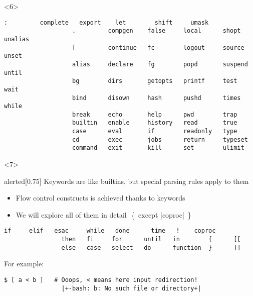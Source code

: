\begin{frame}
\begin{overlayarea}{\textwidth}{0.7\textheight}
\begin{onlyenv}
\begin{onlyenv}
            \end{onlyenv}
            \begin{onlyenv}<6>
                \begin{lstlisting}[style=MyBash, numbers=none]
                   :         complete   export    let        shift     umask  
                   .         compgen    false     local      shopt     unalias
                   [         continue   fc        logout     source    unset  
                   alias     declare    fg        popd       suspend   until  
                   bg        dirs       getopts   printf     test      wait   
                   bind      disown     hash      pushd      times     while  
                   break     echo       help      pwd        trap      
                   builtin   enable     history   read       true      
                   case      eval       if        readonly   type      
                   cd        exec       jobs      return     typeset   
                   command   exit       kill      set        ulimit    
                \end{lstlisting}
            \end{onlyenv}
        \end{onlyenv}
        \begin{onlyenv}<7>
            \begin{varblock}{alerted}[0.75\textwidth]{}
                Keywords are like builtins, but \alert{special parsing rules apply to them}
            \end{varblock}
            \begin{itemize}
                \item Flow control constructs is achieved thanks to keywords
                \item We will explore all of them in detail \,\,{\tiny\{~except \bash|coproc|~\}}
            \end{itemize}
            \begin{lstlisting}[style=MyBash, numbers=none]
                if     elif   esac     while   done      time   !    coproc
                then   fi     for      until   in        {      [[
                else   case   select   do      function  }      ]]
            \end{lstlisting}
            \bigskip
            For example:
            \medskip
            \begin{lstlisting}[style=MyBash]
                $ [ a < b ]   # Ooops, < means here input redirection!
                |+-bash: b: No such file or directory+|

\end{lstlisting}
\end{onlyenv}
\end{overlayarea}
\end{frame}
